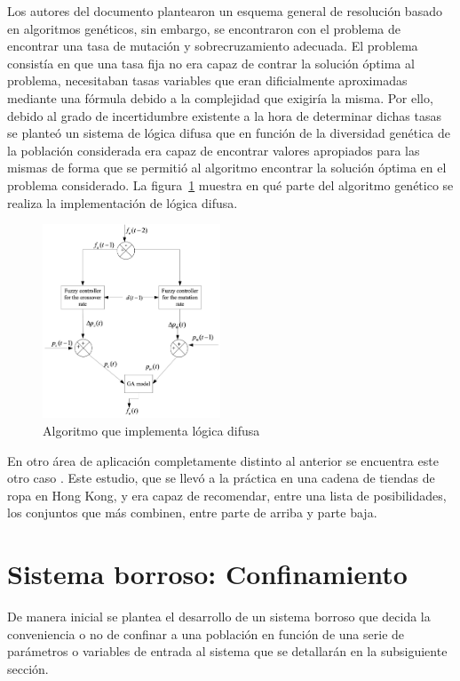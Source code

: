 \documentclass[12pt,a4paper, xcolor=table]{article}
\begin{document}
\vspace{2mm}

Los autores del documento plantearon un esquema general de resolución basado en algoritmos genéticos, sin embargo, se encontraron con el problema de encontrar una tasa de mutación y sobrecruzamiento adecuada. El problema consistía en que una tasa fija no era capaz de contrar la solución óptima al problema, necesitaban tasas variables que eran dificialmente aproximadas mediante una fórmula debido a la complejidad que exigiría la misma. Por ello, debido al grado de incertidumbre existente a la hora de determinar dichas tasas se planteó un sistema de lógica difusa que en función de la diversidad genética de la población considerada era capaz de encontrar valores apropiados para las mismas de forma que se permitió al algoritmo encontrar la solución óptima en el problema considerado. La figura~\ref{genetic_fuzzy} muestra en qué parte del algoritmo genético se realiza la implementación de lógica difusa.

\begin{figure}[!h]
    \centering
    \includegraphics[width=200px]{img/genetic_fuzzy.png}
    \caption{Algoritmo que implementa lógica difusa\cite{fuzzytrain}}
    \label{genetic_fuzzy}
\end{figure}


\vspace{3mm}

En otro área de aplicación completamente distinto al anterior se encuentra este otro caso \cite{fuzzyfashion}. Este estudio, que se llevó a la práctica en una cadena de tiendas de ropa en Hong Kong, y era capaz de recomendar, entre una lista de posibilidades, los conjuntos que más combinen, entre parte de arriba y parte baja.

\newpage

\section{Sistema borroso: Confinamiento}
De manera inicial se plantea el desarrollo de un sistema borroso que decida la conveniencia o no de confinar a una población en función de una serie de parámetros o variables de entrada al sistema que se detallarán en la subsiguiente sección.
\end{document}
